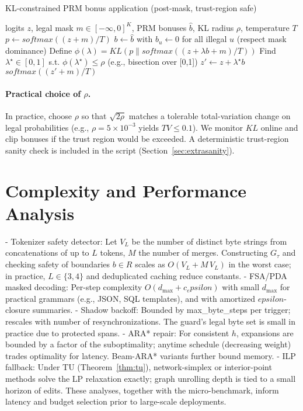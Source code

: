 \documentclass{article}
\def\epsilon{epsilon}%
\def\mathcal#1{#1}%
\def\mathrm#1{#1}%
\def\;{ }%
\begin{document}
\begin{algorithm}[h]
\caption{KL-constrained PRM bonus application (post-mask, trust-region safe)}
\label{alg:prm_kl}
\begin{algorithmic}[1]
\Require logits $z$, legal mask $m\in[-\infty,0]^K$, PRM bonuses $\hat{b}$, KL radius $\rho$, temperature $T$
\State $p \gets \mathrm{softmax}((z+m)/T)$ 
\State $b \gets \hat{b}$ with $b_u \gets 0$ for all illegal $u$ (respect mask dominance)
\State Define $\phi(\lambda) = \mathrm{KL}\!\left(p \;\middle\|\; \mathrm{softmax}((z+\lambda b+m)/T)\right)$
\State Find $\lambda^\star \in [0,1]$ s.t. $\phi(\lambda^\star)\le \rho$ (e.g., bisection over [0,1])
\State $z' \gets z + \lambda^\star b$
\State \Return $\mathrm{softmax}((z'+m)/T)$
\end{algorithmic}
\end{algorithm}

\paragraph{Practical choice of $\rho$.} In practice, choose $\rho$ so that $\sqrt{2\rho}$ matches a tolerable total-variation change on legal probabilities (e.g., $\rho=5\times10^{-3}$ yields $\mathrm{TV}\le 0.1$). We monitor $\mathrm{KL}$ online and clip bonuses if the trust region would be exceeded. A deterministic trust-region sanity check is included in the script (Section~\ref{sec:extrasanity}).

\section{Complexity and Performance Analysis}\label{sec:complexity}
- Tokenizer safety detector: Let $V_L$ be the number of distinct byte strings from concatenations of up to $L$ tokens, $M$ the number of merges. Constructing $G_\tau$ and checking safety of boundaries $b\in\mathcal{R}$ scales as $O(V_L + M\,V_L)$ in the worst case; in practice, $L\in\{3,4\}$ and deduplicated caching reduce constants.
- FSA/PDA masked decoding: Per-step complexity $O(d_{\max}+c_\epsilon)$ with small $d_{\max}$ for practical grammars (e.g., JSON, SQL templates), and with amortized $\epsilon$-closure summaries.
- Shadow backoff: Bounded by max\_byte\_steps per trigger; rescales with number of resynchronizations. The guard’s legal byte set is small in practice due to protected spans.
- ARA* repair: For consistent $h$, expansions are bounded by a factor of the suboptimality; anytime schedule (decreasing weight) trades optimality for latency. Beam-ARA* variants further bound memory.
- ILP fallback: Under TU (Theorem~\ref{thm:tu}), network-simplex or interior-point methods solve the LP relaxation exactly; graph unrolling depth is tied to a small horizon of edits.
These analyses, together with the micro-benchmark, inform latency and budget selection prior to large-scale deployments.
\end{document}
